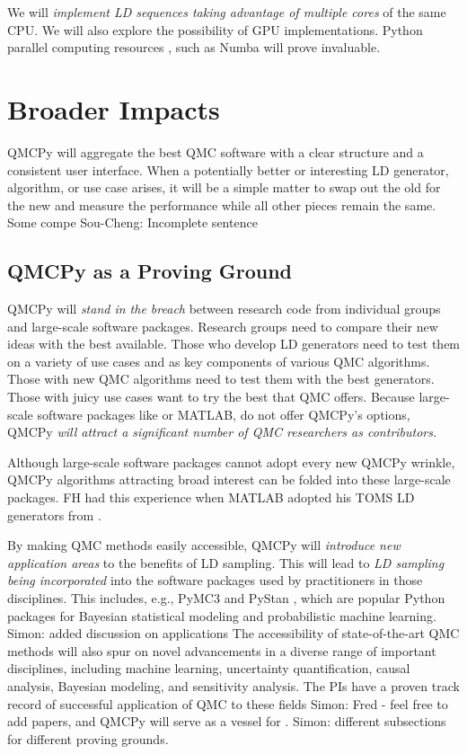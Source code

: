 \documentclass[11pt]{NSFamsart}
\newcommand{\SMNote}[1]{{\color{blue}Simon: #1}}
\newcommand{\SCTCNote}[1]{{\color{green}Sou-Cheng: #1}}
\begin{document}
We will \emph{implement LD sequences taking advantage of multiple cores} of the same CPU.  We will also explore the possibility of GPU implementations.  Python parallel computing resources \cite{ParallelPython}, such as Numba \cite{Numba} will prove invaluable.



\section{Broader Impacts}

QMCPy will aggregate the best QMC software with a clear structure and a consistent user interface.  When a potentially better or interesting LD generator, algorithm, or use case arises, it will be a simple matter to swap out the old for the new and measure the performance while all other pieces remain the same.  Some compe \SCTCNote{Incomplete sentence}

\subsection{QMCPy as a Proving Ground}
QMCPy will \emph{stand in the breach} between research code from individual groups and large-scale software packages.  Research groups need to compare their new ideas with the best available.  Those who develop LD generators need to test them on a variety of use cases and as key components of various QMC algorithms.  Those with new QMC algorithms need to test them with the best generators.  Those with juicy use cases want to try the best that QMC offers.  Because large-scale software packages like  or MATLAB, do not offer QMCPy's options,  QMCPy \emph{will attract a significant number of QMC researchers as contributors.}

Although large-scale software packages cannot adopt every new QMCPy wrinkle, QMCPy algorithms attracting broad interest can be folded into these large-scale packages. FH had this experience when MATLAB adopted his TOMS LD generators from \cite{HonHic00a}.

By making QMC methods easily accessible, QMCPy will \emph{introduce new application areas} to the benefits of LD sampling.  This will lead to \emph{LD sampling being incorporated} into the software packages used by practitioners in those disciplines. This includes, e.g., PyMC3 \citep{salvatier2016probabilistic} and PyStan \citep{stan2017pystan}, which are popular Python packages for Bayesian statistical modeling and probabilistic machine learning. \SMNote{added discussion on applications} The accessibility of state-of-the-art QMC methods will also spur on novel advancements in a diverse range of important disciplines, including machine learning, uncertainty quantification, causal analysis, Bayesian modeling, and sensitivity analysis. The PIs have a proven track record of successful application of QMC to these fields \citep{mak2018support,chen2019hierarchical,huling2020energy,chen2020function,chen2019adaptive,mak2018efficient} \SMNote{Fred - feel free to add papers}, and QMCPy will serve as a vessel for . \SMNote{different subsections for different proving grounds.}
\end{document}
